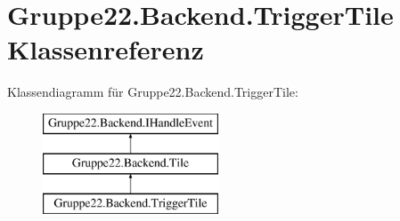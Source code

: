 \hypertarget{class_gruppe22_1_1_backend_1_1_trigger_tile}{\section{Gruppe22.\-Backend.\-Trigger\-Tile Klassenreferenz}
\label{class_gruppe22_1_1_backend_1_1_trigger_tile}
}
Klassendiagramm für Gruppe22.\-Backend.\-Trigger\-Tile\-:\begin{figure}[H]
\begin{center}
\leavevmode
\includegraphics[height=3.000000cm]{class_gruppe22_1_1_backend_1_1_trigger_tile}
\end{center}
\end{figure}
